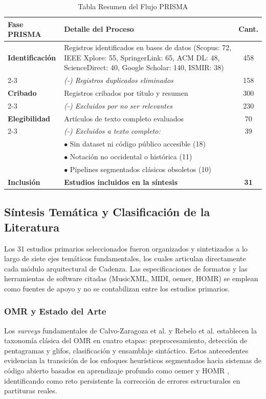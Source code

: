 \documentclass[conference]{IEEEtran}
\begin{document}
\begin{table}[htbp]
\caption{Tabla Resumen del Flujo PRISMA}
\label{tab:resumen-prisma}
\centering
\footnotesize
\begin{tabular}{|l|p{4.8cm}|c|}
\hline
\textbf{Fase PRISMA} & \textbf{Detalle del Proceso} & \textbf{Cant.} \\
\hline
\textbf{Identificación} & Registros identificados en bases de datos (Scopus: 72, IEEE Xplore: 55, SpringerLink: 65, ACM DL: 48, ScienceDirect: 40, Google Scholar: 140, ISMIR: 38) & 458 \\
\cline{2-3}
& \emph{(-) Registros duplicados eliminados} & 158 \\
\hline
\textbf{Cribado} & Registros cribados por título y resumen & 300 \\
\cline{2-3}
& \emph{(-) Excluidos por no ser relevantes} & 230 \\
\hline
\textbf{Elegibilidad} & Artículos de texto completo evaluados & 70 \\
\cline{2-3}
& \emph{(-) Excluidos a texto completo:} & 39 \\
& \quad $\bullet$ Sin dataset ni código público accesible (18) & \\
& \quad $\bullet$ Notación no occidental o histórica (11) & \\
& \quad $\bullet$ Pipelines segmentados clásicos obsoletos (10) & \\
\hline
\textbf{Inclusión} & \textbf{Estudios incluidos en la síntesis} & \textbf{31} \\
\hline
\end{tabular}
\end{table}

\subsection{Síntesis Temática y Clasificación de la Literatura}
\label{sec:sintesis-literatura}

Los 31 estudios primarios seleccionados fueron organizados y sintetizados a lo largo de siete ejes temáticos fundamentales, los cuales articulan directamente cada módulo arquitectural de Cadenza. Las especificaciones de formatos y las herramientas de software citadas (MusicXML, MIDI, oemer, HOMR) se emplean como fuentes de apoyo y no se contabilizan entre los estudios primarios.

\subsubsection{OMR y Estado del Arte}
Los \emph{surveys} fundamentales de Calvo-Zaragoza et al. \cite{omr2020} y Rebelo et al. \cite{rebelo2012} establecen la taxonomía clásica del OMR en cuatro etapas: preprocesamiento, detección de pentagramas y glifos, clasificación y ensamblaje sintáctico. Estos antecedentes evidencian la transición de los enfoques heurísticos segmentados hacia sistemas de código abierto basados en aprendizaje profundo como oemer \cite{oemer2021} y HOMR \cite{homr2024}, identificando como reto persistente la corrección de errores estructurales en partituras reales.
\end{document}
